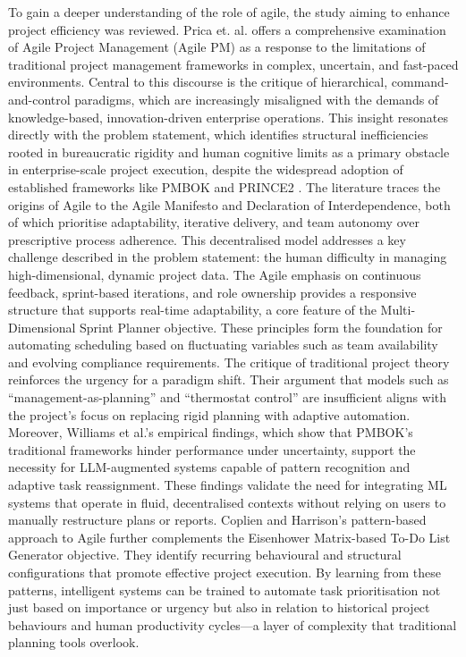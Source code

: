 \documentclass{report}
\begin{document}
To gain a deeper understanding of the role of agile, the study aiming to enhance project efficiency was reviewed. Prica et. al. offers a comprehensive examination of Agile Project Management (Agile PM) as a response to the limitations of traditional project management frameworks in complex, uncertain, and fast-paced environments. Central to this discourse is the critique of hierarchical, command-and-control paradigms, which are increasingly misaligned with the demands of knowledge-based, innovation-driven enterprise operations. This insight resonates directly with the problem statement, which identifies structural inefficiencies rooted in bureaucratic rigidity and human cognitive limits as a primary obstacle in enterprise-scale project execution, despite the widespread adoption of established frameworks like PMBOK and PRINCE2 \parencite{pricaEnhancingProjectEfficiency2025}.
The literature traces the origins of Agile to the Agile Manifesto and Declaration of Interdependence, both of which prioritise adaptability, iterative delivery, and team autonomy over prescriptive process adherence. This decentralised model addresses a key challenge described in the problem statement: the human difficulty in managing high-dimensional, dynamic project data. The Agile emphasis on continuous feedback, sprint-based iterations, and role ownership provides a responsive structure that supports real-time adaptability, a core feature of the Multi-Dimensional Sprint Planner objective. These principles form the foundation for automating scheduling based on fluctuating variables such as team availability and evolving compliance requirements.
The critique of traditional project theory reinforces the urgency for a paradigm shift. Their argument that models such as “management-as-planning” and “thermostat control” are insufficient aligns with the project's focus on replacing rigid planning with adaptive automation. Moreover, Williams et al.’s empirical findings, which show that PMBOK’s traditional frameworks hinder performance under uncertainty, support the necessity for LLM-augmented systems capable of pattern recognition and adaptive task reassignment. These findings validate the need for integrating ML systems that operate in fluid, decentralised contexts without relying on users to manually restructure plans or reports.
Coplien and Harrison’s pattern-based approach to Agile further complements the Eisenhower Matrix-based To-Do List Generator objective. They identify recurring behavioural and structural configurations that promote effective project execution. By learning from these patterns, intelligent systems can be trained to automate task prioritisation not just based on importance or urgency but also in relation to historical project behaviours and human productivity cycles—a layer of complexity that traditional planning tools overlook.
\end{document}
